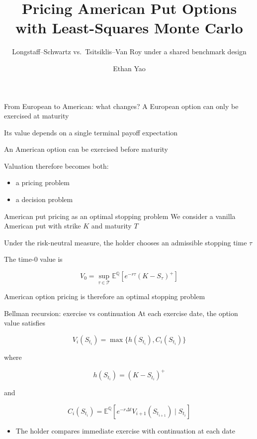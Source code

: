 \documentclass[
  11pt,
  ignorenonframetext,
  aspectratio=169,
]{beamer}
\title{Pricing American Put Options with Least-Squares Monte Carlo}
\subtitle{Longstaff--Schwartz vs.~Tsitsiklis--Van Roy under a shared
benchmark design}
\author{Ethan Yao}
\date{}
\providecommand{\tightlist}{%
  \setlength{\itemsep}{0pt}\setlength{\parskip}{0pt}}
\begin{document}
\frame{\titlepage}


\begin{frame}{From European to American: what changes?}
\label{from-european-to-american-what-changes}
A European option can only be exercised at maturity

Its value depends on a single terminal payoff expectation

An American option can be exercised before maturity

Valuation therefore becomes both:

\begin{itemize}
\tightlist
\item
  a pricing problem
\item
  a decision problem
\end{itemize}
\end{frame}

\begin{frame}{American put pricing as an optimal stopping problem}
\label{american-put-pricing-as-an-optimal-stopping-problem}
We consider a vanilla American put with strike \(K\) and maturity \(T\)

Under the risk-neutral measure, the holder chooses an admissible
stopping time \(\tau\)

The time-0 value is

\[
V_0=\sup_{\tau\in\mathcal T}\mathbb E^{\mathbb Q}\left[e^{-r\tau}(K-S_\tau)^+\right]
\]

American option pricing is therefore an optimal stopping problem
\end{frame}

\begin{frame}{Bellman recursion: exercise vs continuation}
\label{bellman-recursion-exercise-vs-continuation}
At each exercise date, the option value satisfies

\[
V_i(S_{t_i})=\max\{h(S_{t_i}),C_i(S_{t_i})\}
\]

where

\[
h(S_{t_i})=(K-S_{t_i})^+
\]

and

\[
C_i(S_{t_i})=\mathbb E^{\mathbb Q}\left[e^{-r\Delta t}V_{i+1}(S_{t_{i+1}})\mid S_{t_i}\right]
\]

\begin{itemize}
\tightlist
\item
  The holder compares immediate exercise with continuation at each date
\end{itemize}
\end{frame}
\end{document}

